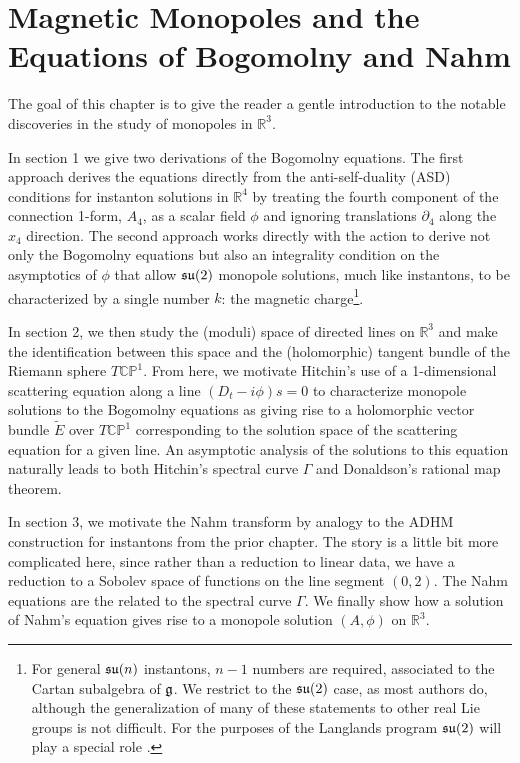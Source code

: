 \chapter{Magnetic Monopoles and the Equations of Bogomolny and Nahm\label{ch:monopoles}}
	
	The goal of this chapter is to give the reader a gentle introduction to the notable discoveries in the study of monopoles in $\mathbb R^3$.
	
	In section 1 we give two derivations of the Bogomolny equations. The first approach derives the equations directly from the anti-self-duality (ASD) conditions for instanton solutions in $\mathbb R^4$ by treating the fourth component of the connection 1-form, $A_4$, as a scalar field $\phi$ and ignoring translations $\partial_4$ along the $x_4$ direction. The second approach works directly with the action to derive not only the Bogomolny equations but also an integrality condition on the asymptotics of $\phi$ that allow $\frak{su}(2)$ monopole solutions, much like instantons, to be characterized by a single number $k$: the magnetic charge\footnote{For general $\frak{su}(n)$ instantons, $n-1$ numbers are required, associated to the Cartan subalgebra of $\frak{g}$. We restrict to the $\frak{su}(2)$ case, as most authors do, although the generalization of many of these statements to other real Lie groups is not difficult. For the purposes of the Langlands program $\frak{su}(2)$ will play a special role \cite{witten2010}.}.
	
	In section 2, we then study the (moduli) space of directed lines on $\mathbb R^3$ and make the identification between this space and the (holomorphic) tangent bundle of the Riemann sphere $T \mathbb{CP}^1$. From here, we motivate Hitchin's use of a 1-dimensional scattering equation along a line $(D_{t} - i \phi)s = 0$ to characterize monopole solutions to the Bogomolny equations as giving rise to a holomorphic vector bundle $\tilde E$ over $T\mathbb{CP}^1$ corresponding to the solution space of the scattering equation for a given line. An asymptotic analysis of the solutions to this equation naturally leads to both Hitchin's spectral curve $\Gamma$ and Donaldson's rational map theorem.
	
	In section 3, we motivate the Nahm transform by analogy to the ADHM construction for instantons from the prior chapter. The story is a little bit more complicated here, since rather than a reduction to linear data, we have a reduction to a Sobolev space of functions on the line segment $(0, 2)$. The Nahm equations are the related to the spectral curve $\Gamma$. We finally show how a solution of Nahm's equation gives rise to a monopole solution $(A, \phi)$ on $\mathbb R^3$.
		

